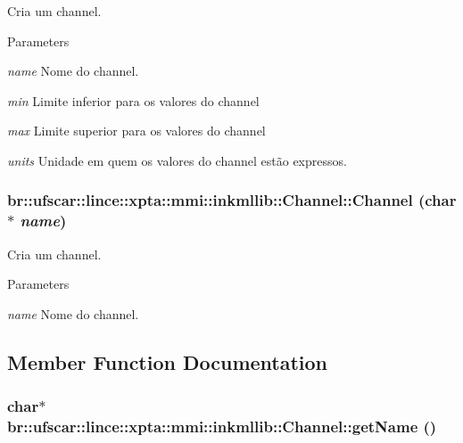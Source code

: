 Cria um channel. 


\begin{DoxyParams}{Parameters}
\item[{\em name}]Nome do channel. \item[{\em min}]Limite inferior para os valores do channel \item[{\em max}]Limite superior para os valores do channel \item[{\em units}]Unidade em quem os valores do channel estão expressos. \end{DoxyParams}
\hypertarget{classbr_1_1ufscar_1_1lince_1_1xpta_1_1mmi_1_1inkmllib_1_1Channel_a64137ab8133b3235bc89ab446a94daab}{
\subsubsection[{Channel}]{\setlength{\rightskip}{0pt plus 5cm}br::ufscar::lince::xpta::mmi::inkmllib::Channel::Channel (char $\ast$ {\em name})}}
\label{classbr_1_1ufscar_1_1lince_1_1xpta_1_1mmi_1_1inkmllib_1_1Channel_a64137ab8133b3235bc89ab446a94daab}


Cria um channel. 


\begin{DoxyParams}{Parameters}
\item[{\em name}]Nome do channel. \end{DoxyParams}


\subsection{Member Function Documentation}
\hypertarget{classbr_1_1ufscar_1_1lince_1_1xpta_1_1mmi_1_1inkmllib_1_1Channel_a0c8bc29ec3a0bed2c1edcb2a142e3e8d}{
\subsubsection[{getName}]{\setlength{\rightskip}{0pt plus 5cm}char$\ast$ br::ufscar::lince::xpta::mmi::inkmllib::Channel::getName ()}}
\label{classbr_1_1ufscar_1_1lince_1_1xpta_1_1mmi_1_1inkmllib_1_1Channel_a0c8bc29ec3a0bed2c1edcb2a142e3e8d}


